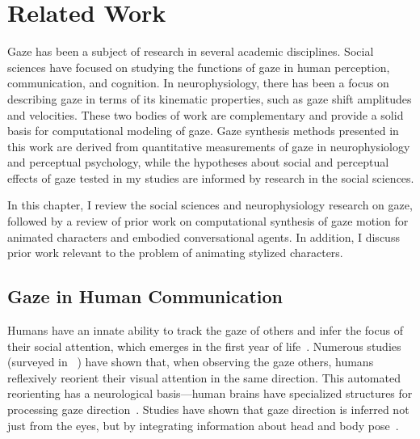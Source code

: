 \pagestyle{deposit}

\chapter{Related Work}

Gaze has been a subject of research in several academic disciplines. Social sciences have focused on studying the functions of gaze in human perception, communication, and cognition. In neurophysiology, there has been a focus on describing gaze in terms of its kinematic properties, such as gaze shift amplitudes and velocities. These two bodies of work are complementary and provide a solid basis for computational modeling of gaze. Gaze synthesis methods presented in this work are derived from quantitative measurements of gaze in neurophysiology and perceptual psychology, while the hypotheses about social and perceptual effects of gaze tested in my studies are informed by research in the social sciences.

In this chapter, I review the social sciences and neurophysiology research on gaze, followed by a review of prior work on computational synthesis of gaze motion for animated characters and embodied conversational agents. In addition, I discuss prior work relevant to the problem of animating stylized characters.

\section{Gaze in Human Communication}
\label{sec:GazeHumanCommunication}

Humans have an innate ability to track the gaze of others and infer the focus of their social attention, which emerges in the first year of life~\citep{scaife1975infant,vecera1995detection}. Numerous studies (surveyed in ~\citep{langton2000eyes}) have shown that, when observing the gaze others, humans reflexively reorient their visual attention in the same direction. This automated reorienting has a neurological basis---human brains have specialized structures for processing gaze direction~\citep{emery2000eyes}. Studies have shown that gaze direction is inferred not just from the eyes, but by integrating information about head and body pose~\citep{hietanen1999does,langton2000eyes,hietanen2002social,pomianowska2011socialcues}.

